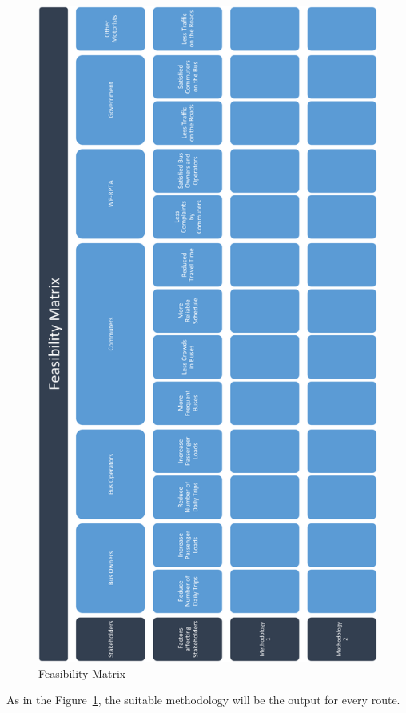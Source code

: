 \documentclass[12pt, oneside]{report}
\begin{document}
\begin {figure} [h!]
\centering
\includegraphics[scale=0.6]{feasibilityMatrix}
\caption [Feasibility Matrix] {Feasibility Matrix}
\label {image-feasibilityMatrix}
\end {figure}

As in the Figure~\ref{image-feasibilityMatrix}, the suitable methodology will be the output for every route.
\end{document}
